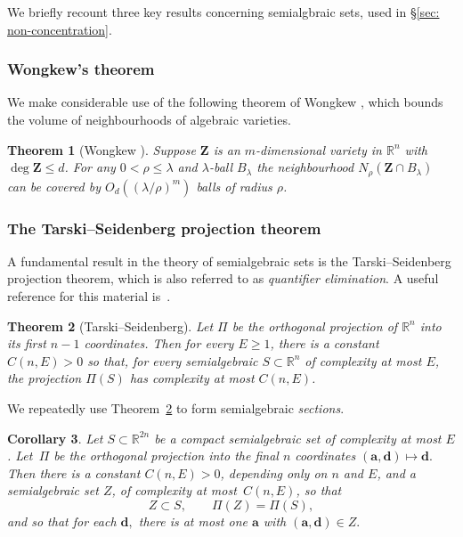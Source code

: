 \documentclass[reqno]{amsart}
\numberwithin{equation}{section}
\newcommand{\R}{\mathbb{R}}
\newcommand{\bZ}{\mathbf{Z}}
\theoremstyle{plain}
\newtheorem{theorem}{Theorem}[section]
\newtheorem{corollary}[theorem]{Corollary}
\theoremstyle{definition}
\begin{document}
We briefly recount three key results concerning semialgbraic sets, used in \S\ref{sec: non-concentration}. 

\subsubsection*{Wongkew's theorem} We make considerable use of the following theorem of Wongkew \cite{Wongkew1993}, which bounds the volume of neighbourhoods of algebraic varieties.

\begin{theorem}[Wongkew \cite{Wongkew1993}]
Suppose $\bZ$ is an $m$-dimensional variety in $\R^n$ with $\deg \bZ \leq d$. For any $0 < \rho \leq \lambda$ and $\lambda$-ball $B_{\lambda}$ the neighbourhood $N_{\!\rho}(\bZ\cap B_{\lambda})$ can be covered by $O_d( (\lambda/\rho)^{m})$ balls of radius $\rho$.
\end{theorem}



\subsubsection*{The Tarski--Seidenberg projection theorem} A fundamental result in the theory of semialgebraic sets is the Tarski--Seidenberg projection theorem, which is also referred to as \textit{quantifier elimination}. A useful reference for this material is~\cite{BPR2006}. 

\begin{theorem}[Tarski--Seidenberg]\label{thm: Tarski}
Let $\Pi $ be the orthogonal projection of $\mathbb{R}^n$ into its first $n-1$ coordinates. Then for every $E\ge 1$, there is a constant $C(n,E) > 0$ so that, for every  semialgebraic $S \subset \mathbb{R}^n$ of complexity at most $E$, the projection $\Pi(S)$ has complexity at most $C(n,E)$. 
\end{theorem}

We repeatedly use Theorem~\ref{thm: Tarski} to form semialgebraic \textit{sections}.

\begin{corollary}%
Let $S \subset \mathbb{R}^{2n}$ be a compact semialgebraic set of complexity at most $E$. Let~$\Pi$ be the orthogonal projection into the final $n$ coordinates 
$(\mathbf{a},\mathbf{d}) \mapsto \mathbf{d}.$
Then there is a constant $C(n,E)>0$, depending only on $n$ and $E$, and a semialgebraic set $Z$, of complexity at most~$C(n,E)$, so that
$$Z \subset S,\quad\quad
\Pi(Z)= \Pi(S),$$
and so that for each $\mathbf{d},$ there is at most one $\mathbf{a}$ with
$(\mathbf{a},\mathbf{d}) \in Z.$
\end{corollary}
\end{document}
